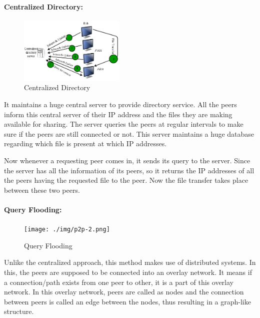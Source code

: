 \documentclass[a4paper,12pt]{article}
\begin{document}
\paragraph{Centralized Directory:}

\begin{figure}
\centering
\includegraphics[width=0.45\textwidth]{./img/p2p-1.png}
\caption{\label{fig:p2p-1} Centralized Directory}
\end{figure}

It maintains a huge central server to provide directory service. All the peers inform this central server of their IP address and the files they are making available for sharing. The server queries the peers at regular intervals to make sure if the peers are still connected or not. This server maintains a huge database regarding which file is present at which IP addresses.

Now whenever a requesting peer comes in, it sends its query to the server. Since the server has all the information of its peers, so it returns the IP addresses of all the peers having the requested file to the peer. Now the file transfer takes place between these two peers.

\paragraph{Query Flooding:}

\begin{figure}
\centering
\texttt{[image: ./img/p2p-2.png]}
\caption{\label{fig:p2p-2}Query Flooding}
\end{figure}

Unlike the centralized approach, this method makes use of distributed systems. In this, the peers are supposed to be connected into an overlay network. It means if a connection/path exists from one peer to other, it is a part of this overlay network. In this overlay network, peers are called as nodes and the connection between peers is called an edge between the nodes, thus resulting in a graph-like structure.
\end{document}
